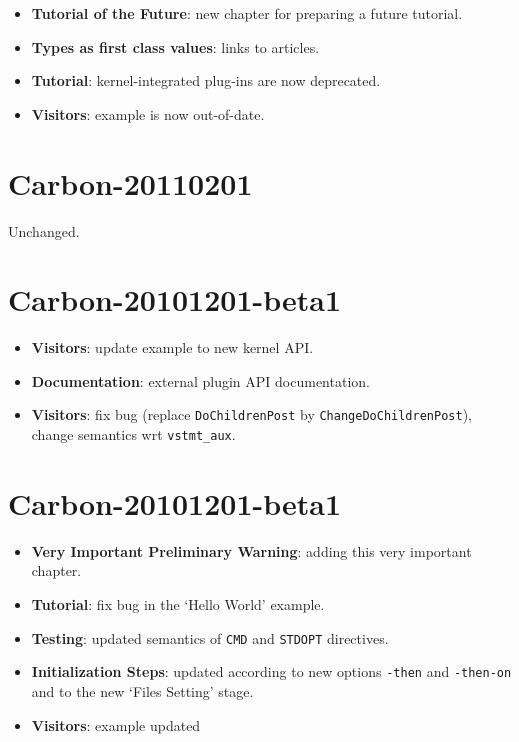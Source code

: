 \begin{itemize}
\item \textbf{Tutorial of the Future}: new chapter for preparing a future
  tutorial.
\item \textbf{Types as first class values}: links to articles.
\item \textbf{Tutorial}: kernel-integrated plug-ins are now deprecated.
\item \textbf{Visitors}: example is now out-of-date.
\end{itemize}

\section*{Carbon-20110201}

Unchanged.

\section*{Carbon-20101201-beta1}

\begin{itemize}
\item \textbf{Visitors}: update example to new kernel API.
\item \textbf{Documentation}: external plugin API documentation.
\item \textbf{Visitors}: fix bug (replace \texttt{DoChildrenPost} by
  \texttt{ChangeDoChildrenPost}), change semantics wrt \verb+vstmt_aux+.
\end{itemize}

\section*{Carbon-20101201-beta1}

\begin{itemize}
\item \textbf{Very Important Preliminary Warning}: adding this very important
  chapter.
\item \textbf{Tutorial}: fix bug in the `Hello World' example.
\item \textbf{Testing}: updated semantics of \texttt{CMD} and
  \texttt{STDOPT} directives.
\item \textbf{Initialization Steps}: updated according to new options
  \texttt{-then} and \texttt{-then-on} and to the new `Files Setting' stage.
\item \textbf{Visitors}: example updated
\end{itemize}

